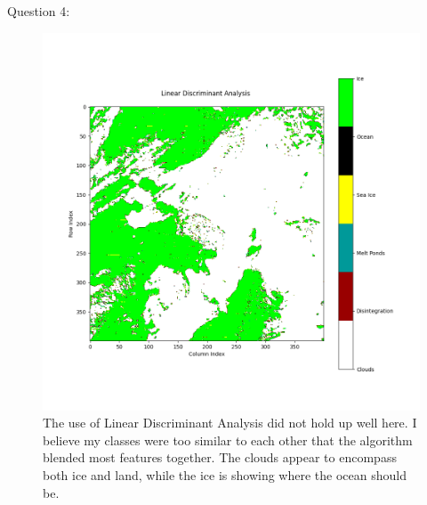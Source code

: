 \documentclass{homework}
\begin{document}

Question 4: \\

\begin{figure}
    \centering
    \includegraphics[width=\textwidth]{images/LinearDiscriminatAnalysis.png}
    \caption{The use of Linear Discriminant Analysis did not hold up well here. I believe my classes were too similar to each other that the algorithm blended most features together. The clouds appear to encompass both ice and land, while the ice is showing where the ocean should be. }
    \label{fig:Linear}
\end{figure}
\end{document}
